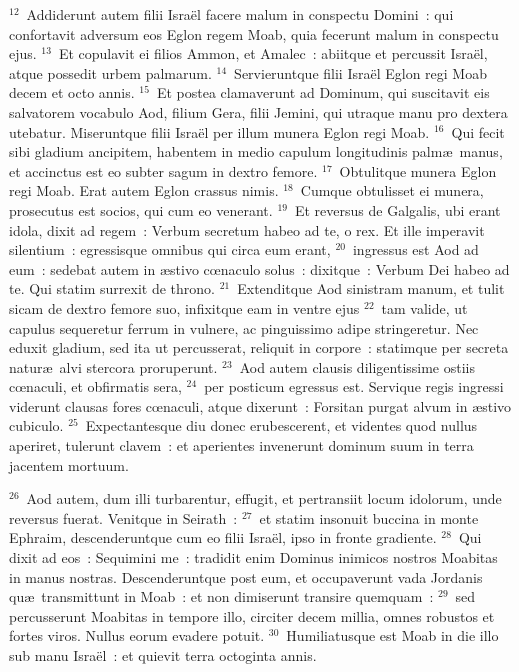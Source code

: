 ${}^{12}$~Addiderunt autem filii Isra\"el facere malum in conspectu Domini~: qui confortavit adversum eos Eglon regem Moab, quia fecerunt malum in conspectu ejus.
${}^{13}$~Et copulavit ei filios Ammon, et Amalec~: abiitque et percussit Isra\"el, atque possedit urbem palmarum.
${}^{14}$~Servieruntque filii Isra\"el Eglon regi Moab decem et octo annis.
${}^{15}$~Et postea clamaverunt ad Dominum, qui suscitavit eis salvatorem vocabulo Aod, filium Gera, filii Jemini, qui utraque manu pro dextera utebatur. Miseruntque filii Isra\"el per illum munera Eglon regi Moab.
${}^{16}$~Qui fecit sibi gladium ancipitem, habentem in medio capulum longitudinis palm\ae\ manus, et accinctus est eo subter sagum in dextro femore.
${}^{17}$~Obtulitque munera Eglon regi Moab. Erat autem Eglon crassus nimis.
${}^{18}$~Cumque obtulisset ei munera, prosecutus est socios, qui cum eo venerant.
${}^{19}$~Et reversus de Galgalis, ubi erant idola, dixit ad regem~: Verbum secretum habeo ad te, o rex. Et ille imperavit silentium~: egressisque omnibus qui circa eum erant,
${}^{20}$~ingressus est Aod ad eum~: sedebat autem in \ae stivo cœnaculo solus~: dixitque~: Verbum Dei habeo ad te. Qui statim surrexit de throno.
${}^{21}$~Extenditque Aod sinistram manum, et tulit sicam de dextro femore suo, infixitque eam in ventre ejus
${}^{22}$~tam valide, ut capulus sequeretur ferrum in vulnere, ac pinguissimo adipe stringeretur. Nec eduxit gladium, sed ita ut percusserat, reliquit in corpore~: statimque per secreta natur\ae\ alvi stercora proruperunt.
${}^{23}$~Aod autem clausis diligentissime ostiis cœnaculi, et obfirmatis sera,
${}^{24}$~per posticum egressus est. Servique regis ingressi viderunt clausas fores cœnaculi, atque dixerunt~: Forsitan purgat alvum in \ae stivo cubiculo.
${}^{25}$~Expectantesque diu donec erubescerent, et videntes quod nullus aperiret, tulerunt clavem~: et aperientes invenerunt dominum suum in terra jacentem mortuum.


${}^{26}$~Aod autem, dum illi turbarentur, effugit, et pertransiit locum idolorum, unde reversus fuerat. Venitque in Seirath~:
${}^{27}$~et statim insonuit buccina in monte Ephraim, descenderuntque cum eo filii Isra\"el, ipso in fronte gradiente.
${}^{28}$~Qui dixit ad eos~: Sequimini me~: tradidit enim Dominus inimicos nostros Moabitas in manus nostras. Descenderuntque post eum, et occupaverunt vada Jordanis qu\ae\ transmittunt in Moab~: et non dimiserunt transire quemquam~:
${}^{29}$~sed percusserunt Moabitas in tempore illo, circiter decem millia, omnes robustos et fortes viros. Nullus eorum evadere potuit.
${}^{30}$~Humiliatusque est Moab in die illo sub manu Isra\"el~: et quievit terra octoginta annis.


